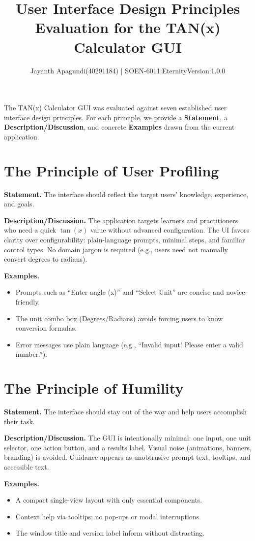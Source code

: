 \documentclass[11pt]{article}
\title{User Interface Design Principles Evaluation for the TAN(x) Calculator GUI}
\author{Jayanth Apagundi(40291184) | SOEN-6011:Eternity\quad Version:1.0.0}
\date{}
\begin{document}
    \maketitle

    The TAN(x) Calculator GUI was evaluated against seven established user interface design principles. For each principle, we provide a \textbf{Statement}, a \textbf{Description/Discussion}, and concrete \textbf{Examples} drawn from the current application.

    \section{The Principle of User Profiling}
    \noindent\textbf{Statement.}
    The interface should reflect the target users' knowledge, experience, and goals.

    \noindent\textbf{Description/Discussion.}
    The application targets learners and practitioners who need a quick $\tan(x)$ value without advanced configuration. The UI favors clarity over configurability: plain-language prompts, minimal steps, and familiar control types. No domain jargon is required (e.g., users need not manually convert degrees to radians).

    \noindent\textbf{Examples.}
    \begin{itemize}
        \item Prompts such as ``Enter angle (x)'' and ``Select Unit'' are concise and novice-friendly.
        \item The unit combo box (Degrees/Radians) avoids forcing users to know conversion formulas.
        \item Error messages use plain language (e.g., ``Invalid input! Please enter a valid number.'').
    \end{itemize}

    \section{The Principle of Humility}
    \noindent\textbf{Statement.}
    The interface should stay out of the way and help users accomplish their task.

    \noindent\textbf{Description/Discussion.}
    The GUI is intentionally minimal: one input, one unit selector, one action button, and a results label. Visual noise (animations, banners, branding) is avoided. Guidance appears as unobtrusive prompt text, tooltips, and accessible text.

    \noindent\textbf{Examples.}
    \begin{itemize}
        \item A compact single-view layout with only essential components.
        \item Context help via tooltips; no pop-ups or modal interruptions.
        \item The window title and version label inform without distracting.
    \end{itemize}
\end{document}
